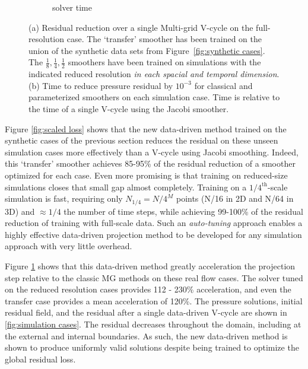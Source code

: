 \documentclass[review]{elsarticle}
\begin{document}
\begin{figure}
\begin{subfigure}[b]{0.47\textwidth}
        \caption{solver time}
        \label{fig:simulation time}
    \end{subfigure}
        \caption{(a) Residual reduction over a single Multi-grid V-cycle on the full-resolution case. The `transfer' smoother has been trained on the union of the synthetic data sets from Figure~\ref{fig:synthetic cases}. The $\frac 18, \frac 14, \frac 12$ smoothers have been trained on simulations with the indicated reduced resolution \textit{in each spacial and temporal dimension}. (b) Time to reduce pressure residual by $10^{-3}$ for classical and parameterized smoothers on each simulation case. Time is relative to the time of a single V-cycle using the Jacobi smoother.}
        \label{fig:tuned simulation}
\end{figure}

Figure \ref{fig:scaled loss} shows that the new data-driven method trained on the synthetic cases of the previous section reduces the residual on these unseen simulation cases more effectively than a V-cycle using Jacobi smoothing. Indeed, this `transfer' smoother achieves 85-95\% of the residual reduction of a smoother optimized for each case. Even more promising is that training on reduced-size simulations closes that small gap almost completely. Training on a $1/4^\text{th}$-scale simulation is fast, requiring only $N_{1/4} = N/4^M$ points (N/16 in 2D and N/64 in 3D) and $\approx 1/4$ the number of time steps, while achieving 99-100\% of the residual reduction of training with full-scale data. Such an \textit{auto-tuning} approach enables a highly effective data-driven projection method to be developed for any simulation approach with very little overhead.

Figure \ref{fig:simulation time} shows that this data-driven method greatly acceleration the projection step relative to the classic MG methods on these real flow cases. The solver tuned on the reduced resolution cases provides 112 - 230\% acceleration, and even the transfer case provides a mean acceleration of 120\%. The pressure solutions, initial residual field, and the residual after a single data-driven V-cycle are shown in \ref{fig:simulation cases}. The residual decreases throughout the domain, including at the external and internal boundaries. As such, the new data-driven method is shown to produce uniformly valid solutions despite being trained to optimize the global residual loss.
\end{document}
